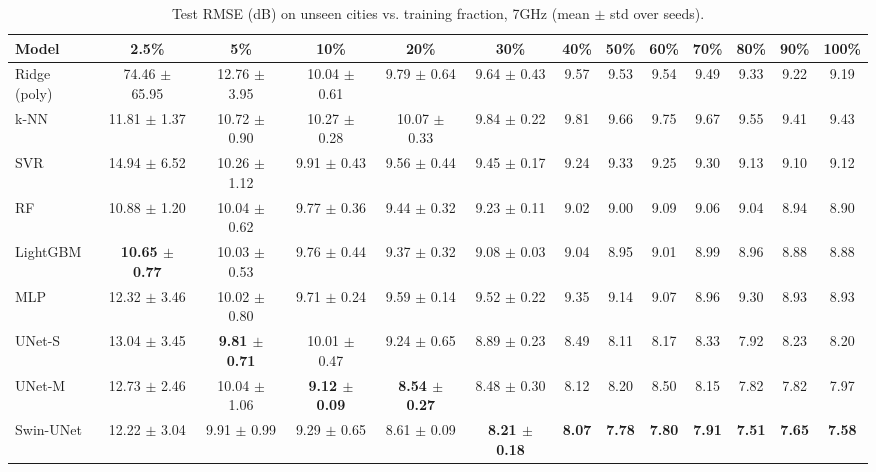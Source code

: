 \begin{table}[t]
\centering
\caption{Test RMSE (dB) on unseen cities vs. training fraction, 7GHz (mean $\pm$ std over seeds).}
\begin{tabular}{lcccccccccccc}
\hline
Model & 2.5\% & 5\% & 10\% & 20\% & 30\% & 40\% & 50\% & 60\% & 70\% & 80\% & 90\% & 100\% \\
\hline
Ridge (poly) & 74.46 $\pm$ 65.95 & 12.76 $\pm$ 3.95 & 10.04 $\pm$ 0.61 & 9.79 $\pm$ 0.64 & 9.64 $\pm$ 0.43 & 9.57 & 9.53 & 9.54 & 9.49 & 9.33 & 9.22 & 9.19 \\
k-NN & 11.81 $\pm$ 1.37 & 10.72 $\pm$ 0.90 & 10.27 $\pm$ 0.28 & 10.07 $\pm$ 0.33 & 9.84 $\pm$ 0.22 & 9.81 & 9.66 & 9.75 & 9.67 & 9.55 & 9.41 & 9.43 \\
SVR & 14.94 $\pm$ 6.52 & 10.26 $\pm$ 1.12 & 9.91 $\pm$ 0.43 & 9.56 $\pm$ 0.44 & 9.45 $\pm$ 0.17 & 9.24 & 9.33 & 9.25 & 9.30 & 9.13 & 9.10 & 9.12 \\
RF & 10.88 $\pm$ 1.20 & 10.04 $\pm$ 0.62 & 9.77 $\pm$ 0.36 & 9.44 $\pm$ 0.32 & 9.23 $\pm$ 0.11 & 9.02 & 9.00 & 9.09 & 9.06 & 9.04 & 8.94 & 8.90 \\
LightGBM & \textbf{10.65 $\pm$ 0.77} & 10.03 $\pm$ 0.53 & 9.76 $\pm$ 0.44 & 9.37 $\pm$ 0.32 & 9.08 $\pm$ 0.03 & 9.04 & 8.95 & 9.01 & 8.99 & 8.96 & 8.88 & 8.88 \\
MLP & 12.32 $\pm$ 3.46 & 10.02 $\pm$ 0.80 & 9.71 $\pm$ 0.24 & 9.59 $\pm$ 0.14 & 9.52 $\pm$ 0.22 & 9.35 & 9.14 & 9.07 & 8.96 & 9.30 & 8.93 & 8.93 \\
UNet-S & 13.04 $\pm$ 3.45 & \textbf{9.81 $\pm$ 0.71} & 10.01 $\pm$ 0.47 & 9.24 $\pm$ 0.65 & 8.89 $\pm$ 0.23 & 8.49 & 8.11 & 8.17 & 8.33 & 7.92 & 8.23 & 8.20 \\
UNet-M & 12.73 $\pm$ 2.46 & 10.04 $\pm$ 1.06 & \textbf{9.12 $\pm$ 0.09} & \textbf{8.54 $\pm$ 0.27} & 8.48 $\pm$ 0.30 & 8.12 & 8.20 & 8.50 & 8.15 & 7.82 & 7.82 & 7.97 \\
Swin-UNet & 12.22 $\pm$ 3.04 & 9.91 $\pm$ 0.99 & 9.29 $\pm$ 0.65 & 8.61 $\pm$ 0.09 & \textbf{8.21 $\pm$ 0.18} & \textbf{8.07} & \textbf{7.78} & \textbf{7.80} & \textbf{7.91} & \textbf{7.51} & \textbf{7.65} & \textbf{7.58} \\
\hline
\end{tabular}
\end{table}